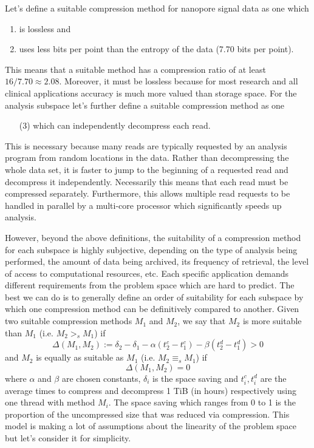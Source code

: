 Let's define a suitable compression method for nanopore signal data as
one which
\begin{enumerate}
	\item is lossless and
	\item uses less bits per point than the entropy of the data (7.70 bits per point).
\end{enumerate}
This means that a suitable method has a compression ratio of at least $16/7.70 \approx 2.08$.
Moreover, it must be lossless because for most research and all clinical
applications accuracy is much more valued than storage space. For
the analysis subspace let's further define a suitable compression method as one
\begin{enumerate}
	\item[(3)] which can independently decompress each read.
\end{enumerate}
This is necessary because many
reads are typically requested by an analysis program from random locations in
the data. Rather than decompressing the whole data set, it is faster to jump to
the beginning of a requested read and decompress it independently.
Necessarily this means that each read must be compressed separately.
Furthermore, this allows multiple read requests to be handled in parallel by a
multi-core processor which significantly speeds up analysis.

However, beyond the above definitions, the suitability of a compression method
for each subspace is highly subjective, depending on the type of analysis being
performed, the amount of data being archived, its frequency of retrieval, the
level of access to computational resources, etc. Each specific application
demands different requirements from the problem space which are hard to predict.
The best we can do is to generally define an order of suitability for each
subspace by which one compression method can be definitively compared to
another. Given two suitable compression methods $M_1$ and $M_2$, we say that
$M_2$ is more suitable than $M_1$ (i.e. $M_2>_sM_1$) if
\[\Delta(M_1,M_2):=\delta_2-\delta_1 - \alpha(t^c_2-t^c_1) - \beta(t^d_2-t^d_1) > 0\]
and $M_2$ is equally as suitable as $M_1$ (i.e. $M_2\equiv_sM_1$) if
\[\Delta(M_1,M_2)= 0\]
where $\alpha$ and $\beta$ are chosen constants, $\delta_i$ is the
space saving and $t^c_i,t^d_i$ are the average times to
compress and decompress 1 TiB (in hours) respectively using one thread with
method $M_i$. The space saving which ranges from 0 to 1 is the proportion of
the uncompressed size that was reduced via compression. This model is making a
lot of assumptions about the linearity of the problem space but let's consider
it for simplicity.

